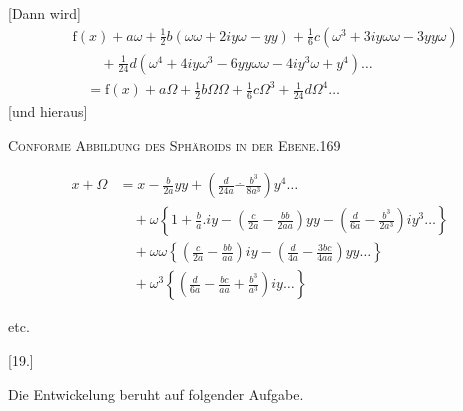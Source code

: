 [Dann wird]
\[
\begin{aligned}
&\mathrm f(x)+a\omega+\tfrac12b(\omega\omega+2iy\omega-yy)+\tfrac16c(\omega^3+3iy\omega\omega-3yy\omega)\\
&\qquad+\tfrac1{24}d(\omega^4+4iy\omega^3-6yy\omega\omega-4iy^3\omega+y^4)\ldots\\
&\quad=\mathrm f(x)+a\Omega+\tfrac12b\Omega\Omega+\tfrac16c\Omega^3+\tfrac1{24}d\Omega^4\ldots
\end{aligned}
\]
[und hieraus]
\par\endgroup
\clearpage
\noindent\mbox{}\hfill\textsc{Conforme Abbildung des Sphäroids in der Ebene.}\hfill169\par\medskip
\begingroup\small
\[
\begin{aligned}
x+\Omega&=x-\frac b{2a}yy+\left(\frac d{24a}\mathbin{\overset{\scriptscriptstyle .}{-}}\frac{b^3}{8a^3}\right)y^4\ldots\\
&\quad+\omega\left\{1+\frac ba.iy-\left(\frac c{2a}-\frac{bb}{2aa}\right)yy-\left(\frac d{6a}-\frac{b^3}{2a^3}\right)iy^3\ldots\right\}\\
&\quad+\omega\omega\left\{\left(\frac c{2a}-\frac{bb}{aa}\right)iy-\left(\frac d{4a}-\frac{3bc}{4aa}\right)yy\ldots\right\}\\
&\quad+\omega^3\left\{\left(\frac d{6a}-\frac{bc}{aa}+\frac{b^3}{a^3}\right)iy\ldots\right\}
\end{aligned}
\]
\begin{center}etc.\end{center}
\bigskip
\begin{center}[19.]\end{center}
Die Entwickelung beruht auf folgender Aufgabe.

